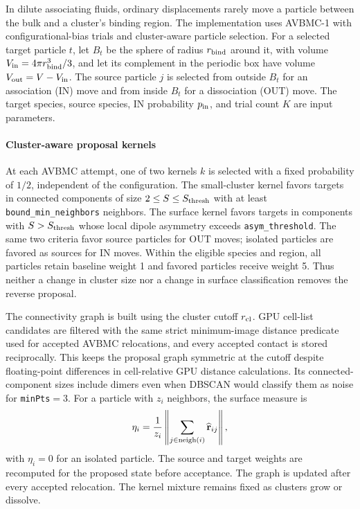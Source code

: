 \documentclass[final,5p,times,twocolumn]{elsarticle}
\begin{document}
In dilute associating fluids, ordinary displacements rarely move a
particle between the bulk and a cluster's binding region. The
implementation uses AVBMC-1 \cite{chen2000avbmc,chen2001avbmc} with
configurational-bias trials and cluster-aware particle selection.
For a selected target particle $t$, let $B_t$ be the sphere of radius
$r_{\rm bind}$ around it, with volume
$V_{\rm in}=4\pi r_{\rm bind}^3/3$, and let its complement in the
periodic box have volume $V_{\rm out}=V-V_{\rm in}$.
The source particle $j$ is selected from outside $B_t$ for an
association (IN) move and from inside $B_t$ for a dissociation (OUT)
move. The target species, source species, IN probability $p_{\rm in}$,
and trial count $K$ are input parameters.

\paragraph{Cluster-aware proposal kernels}
At each AVBMC attempt, one of two kernels $k$ is selected with a fixed
probability of $1/2$, independent of the configuration. The
small-cluster kernel favors targets in connected components of size
$2\le S\le S_{\rm thresh}$ with at least
\texttt{bound\_min\_neighbors} neighbors. The surface kernel favors
targets in components with $S>S_{\rm thresh}$ whose local dipole
asymmetry exceeds \texttt{asym\_threshold}. The same two criteria
favor source particles for OUT moves; isolated particles are favored
as sources for IN moves. Within the eligible species and region,
all particles retain baseline weight 1 and favored particles receive
weight 5. Thus neither a change in cluster size nor a change in
surface classification removes the reverse proposal.

The connectivity graph is built using the cluster cutoff $r_{\rm cl}$.
GPU cell-list candidates are filtered with the same strict minimum-image
distance predicate used for accepted AVBMC relocations, and every accepted
contact is stored reciprocally. This keeps the proposal graph symmetric at
the cutoff despite floating-point differences in cell-relative GPU distance
calculations.
Its connected-component sizes include dimers even when DBSCAN would
classify them as noise for \texttt{minPts}$=3$. For a particle with
$z_i$ neighbors, the surface measure is
\begin{equation}
 \eta_i=\frac{1}{z_i}\left\|
       \sum_{j\in{\rm neigh}(i)}\widehat{\mathbf r}_{ij}
       \right\| ,
 \label{eq:asym}
\end{equation}
with $\eta_i=0$ for an isolated particle. The source and target
weights are recomputed for the proposed state before acceptance.
The graph is updated after every accepted relocation. The kernel
mixture remains fixed as clusters grow or dissolve.
\end{document}
